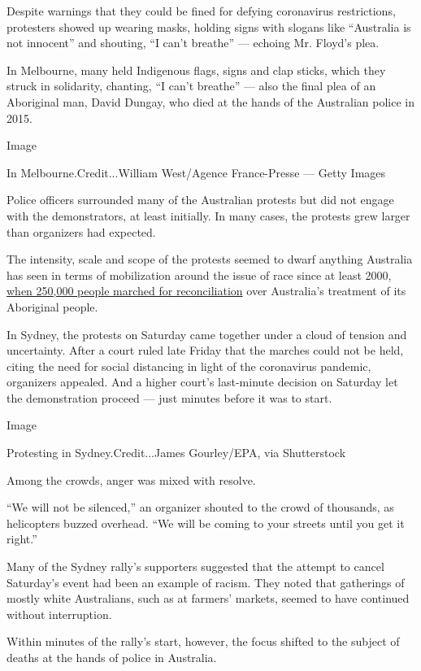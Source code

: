 Despite warnings that they could be fined for defying coronavirus
restrictions, protesters showed up wearing masks, holding signs with
slogans like ``Australia is not innocent'' and shouting, ``I can't
breathe'' --- echoing Mr. Floyd's plea.

In Melbourne, many held Indigenous flags, signs and clap sticks, which
they struck in solidarity, chanting, ``I can't breathe'' --- also the
final plea of an Aboriginal man, David Dungay, who died at the hands of
the Australian police in 2015.

Image

In Melbourne.Credit...William West/Agence France-Presse --- Getty Images

Police officers surrounded many of the Australian protests but did not
engage with the demonstrators, at least initially. In many cases, the
protests grew larger than organizers had expected.

The intensity, scale and scope of the protests seemed to dwarf anything
Australia has seen in terms of mobilization around the issue of race
since at least 2000,
\href{https://www.indigenous.gov.au/news-and-media/stories/20-years-road-reconciliation-continues}{when
250,000 people marched for reconciliation} over Australia's treatment of
its Aboriginal people.

In Sydney, the protests on Saturday came together under a cloud of
tension and uncertainty. After a court ruled late Friday that the
marches could not be held, citing the need for social distancing in
light of the coronavirus pandemic, organizers appealed. And a higher
court's last-minute decision on Saturday let the demonstration proceed
--- just minutes before it was to start.

Image

Protesting in Sydney.Credit...James Gourley/EPA, via Shutterstock

Among the crowds, anger was mixed with resolve.

``We will not be silenced,'' an organizer shouted to the crowd of
thousands, as helicopters buzzed overhead. ``We will be coming to your
streets until you get it right.''

Many of the Sydney rally's supporters suggested that the attempt to
cancel Saturday's event had been an example of racism. They noted that
gatherings of mostly white Australians, such as at farmers' markets,
seemed to have continued without interruption.

Within minutes of the rally's start, however, the focus shifted to the
subject of deaths at the hands of police in Australia.

